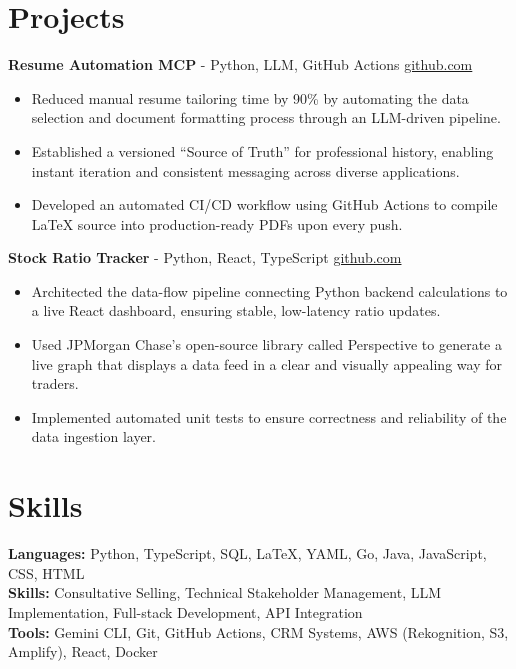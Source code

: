\documentclass[11pt]{article}       %
\begin{document}
\vspace{-18.5pt}

\section*{Projects}

\textbf{Resume Automation MCP}{ - Python, LLM, GitHub Actions} \hfill \href{https://github.com/Monica20030707/Tex_OrangeLeaf-mcp}{github.com} \\
\vspace{-9pt}
\begin{itemize}
  \item Reduced manual resume tailoring time by 90\% by automating the data selection and document formatting process through an LLM-driven pipeline.
  \item Established a versioned ``Source of Truth'' for professional history, enabling instant iteration and consistent messaging across diverse applications.
  \item Developed an automated CI/CD workflow using GitHub Actions to compile LaTeX source into production-ready PDFs upon every push.
\end{itemize}

\textbf{Stock Ratio Tracker}{ - Python, React, TypeScript} \hfill \href{https://github.com/Monica20030707/tradingDashboard-UI}{github.com} \\
\vspace{-9pt}
\begin{itemize}
  \item Architected the data-flow pipeline connecting Python backend calculations to a live React dashboard, ensuring stable, low-latency ratio updates. 
  \item Used JPMorgan Chase’s open-source library called Perspective to generate a live graph that displays a data feed in a clear and visually appealing way for traders.
  \item Implemented automated unit tests to ensure correctness and reliability of the data ingestion layer.
\end{itemize}

\vspace{-18.5pt}

\section*{Skills}
\textbf{Languages:} Python, TypeScript, SQL, LaTeX, YAML, Go, Java, JavaScript, CSS, HTML\\
\textbf{Skills:} Consultative Selling, Technical Stakeholder Management, LLM Implementation, Full-stack Development, API Integration\\
\textbf{Tools:} Gemini CLI, Git, GitHub Actions, CRM Systems, AWS (Rekognition, S3, Amplify), React, Docker\\

\vspace{-6.5pt}
\end{document}
